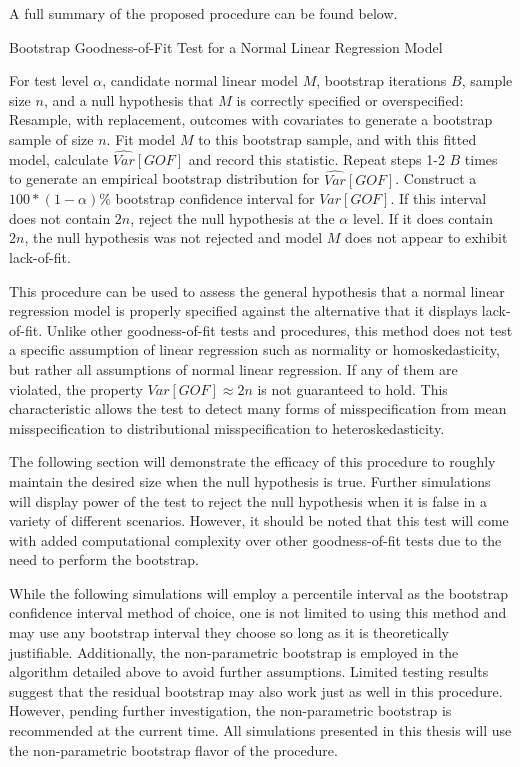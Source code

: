 		A full summary of the proposed procedure can be found below.
		\begin{algorithm}
			\caption{Bootstrap Goodness-of-Fit Test for a Normal Linear Regression Model}
			\begin{algorithmic}[1]
			  \Statex For test level $\alpha$, candidate normal linear model $M$, bootstrap iterations $B$, sample size $n$, and a null hypothesis that $M$
			  is correctly specified or overspecified:
			  \State Resample, with replacement, outcomes with covariates to generate a bootstrap sample of size $n$.
			  \State Fit model $M$ to this bootstrap sample, and with this fitted model, calculate $\widehat{Var}[GOF]$
			  and record this statistic.
			  \State Repeat steps 1-2 $B$ times to generate an empirical bootstrap distribution for $\widehat{Var}[GOF]$.
			  \State Construct a $100*(1-\alpha)$\% bootstrap confidence interval for $Var[GOF]$.
			  \State If this interval does not contain $2n$, reject the null hypothesis at the $\alpha$ level. If it does contain
			  $2n$, the null hypothesis was not rejected and model $M$ does not appear to exhibit lack-of-fit. 
			\end{algorithmic}
		\end{algorithm}

		This procedure can be used to assess the general hypothesis that a normal linear regression model is properly specified against the alternative that it displays lack-of-fit.
		Unlike other goodness-of-fit tests and procedures, this method does not test a specific assumption of linear regression such as normality or homoskedasticity, but rather
		all assumptions of normal linear regression. If any of them are violated, the property $Var[GOF] \approx 2n$ is not guaranteed to hold. This characteristic allows the test to detect
		many forms of misspecification from mean misspecification to distributional misspecification to heteroskedasticity.
		
		The following section will demonstrate the efficacy of this procedure to roughly maintain the desired size when the null hypothesis is true. Further simulations will display power
		of the test to reject the null hypothesis when it is false in a variety of different scenarios. However, it should be noted that this test will come with added computational
		complexity over other goodness-of-fit tests due to the need to perform the bootstrap.
		
		While the following simulations will employ a percentile interval as the bootstrap confidence interval method of choice, one is not limited to using this method
		and may use any bootstrap interval they choose so long as it is theoretically justifiable. Additionally, the non-parametric bootstrap is employed in the algorithm detailed above to avoid further
		assumptions. Limited testing results suggest that the residual bootstrap may also work just as well in this procedure. However, pending further investigation, the non-parametric
		bootstrap is recommended at the current time. All simulations presented in this thesis will use the non-parametric bootstrap flavor of the procedure.
		
